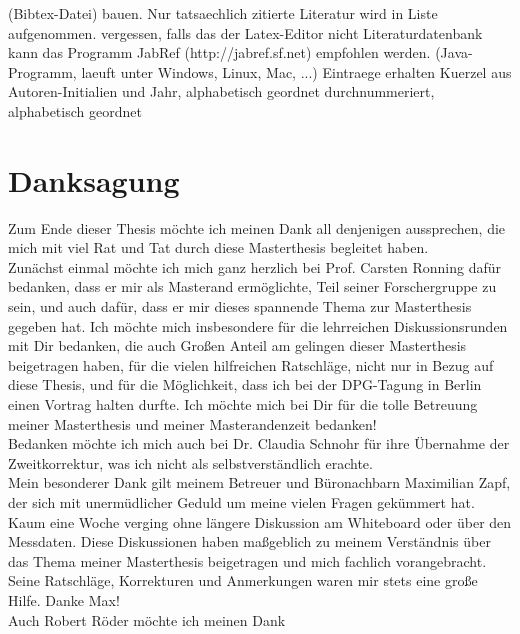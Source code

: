 (Bibtex-Datei) bauen. Nur tatsaechlich zitierte Literatur wird in Liste
aufgenommen. %
vergessen, falls das der Latex-Editor nicht %
Literaturdatenbank kann das Programm JabRef (http://jabref.sf.net) empfohlen
werden. (Java-Programm, laeuft unter Windows, Linux, Mac, ...)
Eintraege erhalten Kuerzel aus Autoren-Initialien und Jahr, alphabetisch
geordnet %
durchnummeriert, alphabetisch geordnet  \newpage
\thispagestyle{empty} \section*{Danksagung} Zum Ende dieser Thesis möchte ich
meinen Dank all denjenigen aussprechen, die mich mit viel Rat und Tat durch
diese Masterthesis begleitet haben.\\ Zunächst einmal möchte ich mich ganz
herzlich bei Prof. Carsten Ronning dafür bedanken, dass er mir als Masterand
ermöglichte, Teil seiner Forschergruppe zu sein, und auch dafür, dass er mir
dieses spannende Thema zur Masterthesis gegeben hat. Ich möchte mich
insbesondere für die lehrreichen Diskussionsrunden mit Dir bedanken, die auch
Großen Anteil am gelingen dieser Masterthesis beigetragen haben, für die vielen
hilfreichen Ratschläge, nicht nur in Bezug auf diese Thesis, und für die
Möglichkeit, dass ich bei der DPG-Tagung in Berlin einen Vortrag halten durfte.
Ich möchte mich bei Dir für die tolle Betreuung meiner Masterthesis und meiner
Masterandenzeit bedanken!\\ Bedanken möchte ich mich auch bei Dr. Claudia
Schnohr für ihre Übernahme der Zweitkorrektur, was ich nicht als
selbstverständlich erachte.\\ Mein besonderer Dank gilt meinem Betreuer und
Büronachbarn Maximilian Zapf, der sich mit unermüdlicher Geduld um meine vielen
Fragen gekümmert hat. Kaum eine Woche verging ohne längere Diskussion am
Whiteboard oder über den Messdaten. Diese Diskussionen haben maßgeblich zu
meinem Verständnis über das Thema meiner Masterthesis beigetragen und mich
fachlich vorangebracht. Seine Ratschläge, Korrekturen und Anmerkungen waren mir
stets eine große Hilfe. Danke Max!\\ Auch Robert Röder möchte ich meinen Dank
